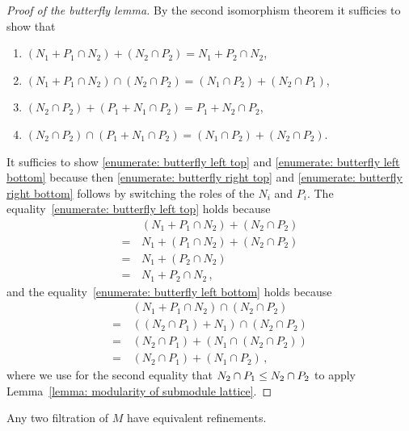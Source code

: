 \begin{proof}[Proof of the butterfly lemma]
  By the second isomorphism theorem it sufficies to show that 
  \begin{enumerate}
    \item
      \label{enumerate: butterfly left top}
      $(N_1 + P_1 \cap N_2) + (N_2 \cap P_2) = N_1 + P_2 \cap N_2$,
    \item
      \label{enumerate: butterfly left bottom}
      $(N_1 + P_1 \cap N_2) \cap (N_2 \cap P_2) = (N_1 \cap P_2) + (N_2 \cap P_1)$,
    \item
      \label{enumerate: butterfly right top}
      $(N_2 \cap P_2) + (P_1 + N_1 \cap P_2) = P_1 + N_2 \cap P_2$,
    \item
      \label{enumerate: butterfly right bottom}
      $(N_2 \cap P_2) \cap (P_1 + N_1 \cap P_2) = (N_1 \cap P_2) + (N_2 \cap P_2)$.
  \end{enumerate}
  It sufficies to show \ref*{enumerate: butterfly left top} and \ref*{enumerate: butterfly left bottom} because then \ref*{enumerate: butterfly right top} and \ref*{enumerate: butterfly right bottom} follows by switching the roles of the $N_i$ and $P_i$.
  The equality~\ref*{enumerate: butterfly left top} holds because
  \begin{align*}
     &\,  (N_1 + P_1 \cap N_2) + (N_2 \cap P_2) \\
    =&\,  N_1 + (P_1 \cap N_2) + (N_2 \cap P_2) \\
    =&\,  N_1 + (P_2 \cap N_2)                  \\
    =&\,  N_1 + P_2 \cap N_2 \,,
  \end{align*}
  and the equality~\ref*{enumerate: butterfly left bottom} holds because
  \begin{align*}
     &\,  (N_1 + P_1 \cap N_2) \cap (N_2 \cap P_2)    \\
    =&\,  ((N_2 \cap P_1) + N_1) \cap (N_2 \cap P_2)  \\
    =&\,  (N_2 \cap P_1) + (N_1 \cap (N_2 \cap P_2))  \\
    =&\,  (N_2 \cap P_1) + (N_1 \cap P_2) \,,
  \end{align*}
  where we use for the second equality that $N_2 \cap P_1 \leq N_2 \cap P_2$ to apply Lemma~\ref{lemma: modularity of submodule lattice}.
\end{proof}


\begin{theorem}[Schreier]
  \label{theorem: schreiers theorem}
  Any two filtration of $M$ have equivalent refinements.
\end{theorem}


